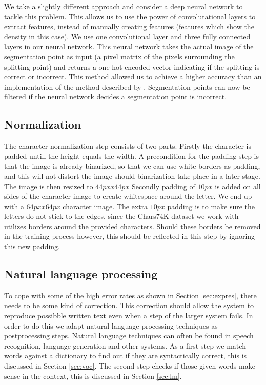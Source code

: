 \documentclass{article}
\begin{document}
We take a slightly different approach and consider a deep neural network to tackle this problem. This allows us to use the power of convolutational layers to extract features, instead of manually creating features (features which show the density in this case). 
We use one convolutional layer and three fully connected layers in our neural network. This neural network takes the actual image of the segmentation point as input (a pixel matrix of the pixels surrounding the splitting point) and returns a one-hot encoded vector indicating if the splitting is correct or incorrect. 
This method allowed us to achieve a higher accuracy than an implementation of the method described by \cite{evalsplitpointsnn}.
Segmentation points can now be filtered if the neural network decides a segmentation point is incorrect. 

\subsection{Normalization}
The character normalization step consists of two parts.
Firstly the character is padded untill the height equals the width.
A precondition for the padding step is that the image is already binarized, so that we can use white borders as padding, and this will not distort the image should binarization take place in a later stage.
The image is then resized to $44px x 44px$
Secondly padding of $10px$ is added on all sides of the character image to create whitespace around the letter.
We end up with a $64px x 64px$ character image.
The extra $10px$ padding is to make sure the letters do not stick to the edges, since the Chars74K dataset we work with utilizes borders around the provided characters. Should these borders be removed in the training process however, this should be reflected in this step by ignoring this new padding.

\subsection{Natural language processing}
To cope with some of the high error rates as shown in Section \ref{sec:expres}, there needs to be some kind of correction. This correction should allow the system to reproduce possibble written text even when a step of the larger system fails. 
In order to do this we adapt natural language processing techniques as postprocessing steps. Natural language techniques can often be found in speech recognition, language generation and other systems. 
As a first step we match words against a dictionary to find out if they are syntactically correct, this is discussed in Section \ref{sec:voc}. The second step checks if those given words make sense in the context, this is discussed in Section \ref{sec:lm}.
\end{document}
